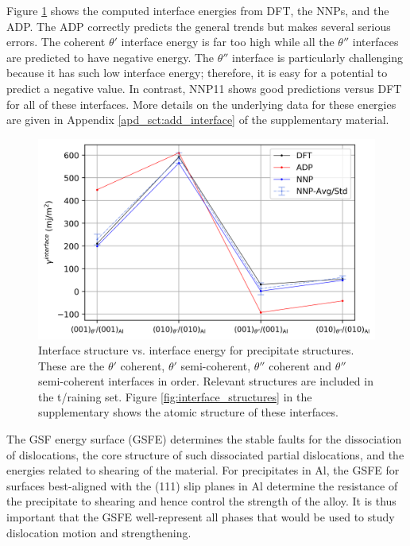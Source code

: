 \documentclass{article}
\begin{document}
Figure \ref{fig:interface_energies} shows the computed interface energies from DFT, the NNPs, and the ADP.
The ADP correctly predicts the general trends but makes several serious errors.
The coherent $\theta'$ interface energy is far too high while all the $\theta''$ interfaces are predicted to have negative energy.
The $\theta''$ interface is particularly challenging because it has such low interface energy; therefore, it is easy for a potential to predict a negative value.
In contrast, NNP11 shows good predictions versus DFT for all of these interfaces.  More details on the underlying data for these energies are given in Appendix \ref{apd_sct:add_interface} of the supplementary material.

\begin{figure}[H]%
\centering%
\includegraphics[width=1\textwidth,center]{./figures/interface_energies.png}%
\caption{Interface structure vs. interface energy for precipitate structures. 
These are the $\theta'$ coherent, $\theta'$ semi-coherent, $\theta''$ coherent and $\theta''$ semi-coherent
interfaces in order. Relevant structures are included in the t/raining set. 
Figure \ref{fig:interface_structures} in the supplementary shows the atomic structure of these interfaces.
}%
\label{fig:interface_energies}
\end{figure}

The GSF energy surface (GSFE) determines the stable faults for the dissociation of dislocations, the core structure of such dissociated partial dislocations, and the energies related to shearing of the material.  For precipitates in Al, the GSFE for surfaces best-aligned with the (111) slip planes in Al determine the resistance of the precipitate to shearing and hence control the strength of the alloy.  It is thus important that the GSFE well-represent all phases that would be used to study dislocation motion and strengthening.  
\end{document}
